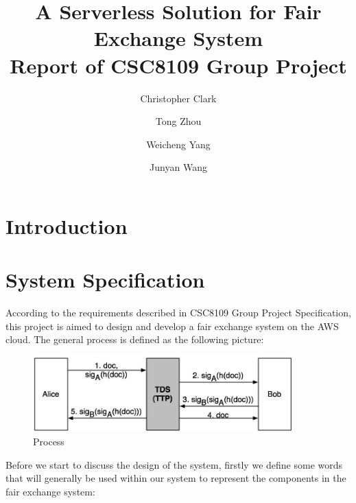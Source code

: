 \documentclass[runningheads]{llncs}
\title{A Serverless Solution for Fair Exchange System \\
	\large{Report of CSC8109 Group Project}} %
\author{Christopher Clark \and Tong Zhou \and Weicheng Yang \and Junyan Wang}
\institute{School of Computing, Newcastle University \\ Newcastle upon Tyne, NE4 5TG}
\begin{document}
\maketitle


\section{Introduction} 


\section{System Specification} 
According to the requirements described in CSC8109 Group Project Specification, this project is aimed to design and develop a fair exchange system on the AWS cloud. The general process is defined as the following picture\cite{csc8109}:

	\begin{figure}[H]
		\centering
		\includegraphics[width=10cm]{reportpics/1.jpg}  
		\caption{Process}
		\label{Process}
	\end{figure}

Before we start to discuss the design of the system, firstly we define some words that will generally be used within our system to represent the components in the fair exchange system:
\end{document}
